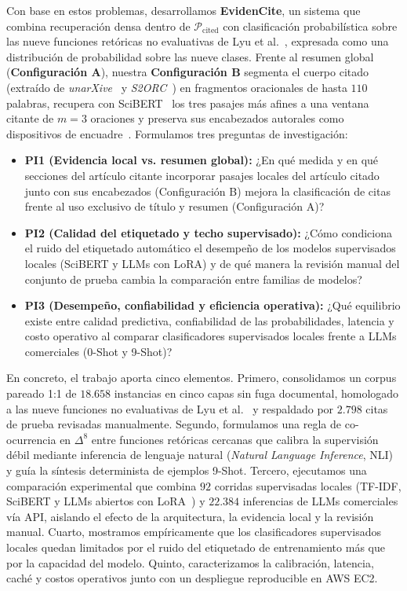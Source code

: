 \documentclass[conference]{IEEEtran}
\begin{document}
Con base en estos problemas, desarrollamos \textbf{EvidenCite}, un sistema que combina recuperación densa dentro de $\mathcal{P}_{\text{cited}}$ con clasificación probabilística sobre las nueve funciones retóricas no evaluativas de Lyu et al.~\cite{lyu2021classification}, expresada como una distribución de probabilidad sobre las nueve clases. Frente al resumen global (\textbf{Configuración A}), nuestra \textbf{Configuración B} segmenta el cuerpo citado (extraído de \textit{unarXive}~\cite{besrour2026unarxive} y \textit{S2ORC}~\cite{lo2020s2orc}) en fragmentos oracionales de hasta $110$ palabras, recupera con SciBERT~\cite{beltagy2019scibert,reimers2019sentence} los tres pasajes más afines a una ventana citante de $m=3$ oraciones y preserva sus encabezados autorales como dispositivos de encuadre~\cite{paolini2025citefusion,goffman1974frame,bertin2014study,pimentel2021disambiguatory}. Formulamos tres preguntas de investigación:
\begin{itemize}
    \item \textbf{PI1 (Evidencia local vs. resumen global):} ¿En qué medida y en qué secciones del artículo citante incorporar pasajes locales del artículo citado junto con sus encabezados (Configuración B) mejora la clasificación de citas frente al uso exclusivo de título y resumen (Configuración A)?
    \item \textbf{PI2 (Calidad del etiquetado y techo supervisado):} ¿Cómo condiciona el ruido del etiquetado automático el desempeño de los modelos supervisados locales (SciBERT y LLMs con LoRA) y de qué manera la revisión manual del conjunto de prueba cambia la comparación entre familias de modelos?
    \item \textbf{PI3 (Desempeño, confiabilidad y eficiencia operativa):} ¿Qué equilibrio existe entre calidad predictiva, confiabilidad de las probabilidades, latencia y costo operativo al comparar clasificadores supervisados locales frente a LLMs comerciales (0-Shot y 9-Shot)?
\end{itemize}

En concreto, el trabajo aporta cinco elementos. Primero, consolidamos un corpus pareado 1:1 de $18.658$ instancias en cinco capas sin fuga documental, homologado a las nueve funciones no evaluativas de Lyu et al.~\cite{lyu2021classification,peroni2012fabio} y respaldado por $2.798$ citas de prueba revisadas manualmente. Segundo, formulamos una regla de co-ocurrencia en $\Delta^8$ entre funciones retóricas cercanas que calibra la supervisión débil mediante inferencia de lenguaje natural (\textit{Natural Language Inference}, NLI) y guía la síntesis determinista de ejemplos 9-Shot. Tercero, ejecutamos una comparación experimental que combina $92$ corridas supervisadas locales (TF-IDF, SciBERT y LLMs abiertos con LoRA~\cite{hu2022lora}) y $22.384$ inferencias de LLMs comerciales vía API, aislando el efecto de la arquitectura, la evidencia local y la revisión manual. Cuarto, mostramos empíricamente que los clasificadores supervisados locales quedan limitados por el ruido del etiquetado de entrenamiento más que por la capacidad del modelo. Quinto, caracterizamos la calibración, latencia, caché y costos operativos junto con un despliegue reproducible en AWS EC2.
\end{document}
